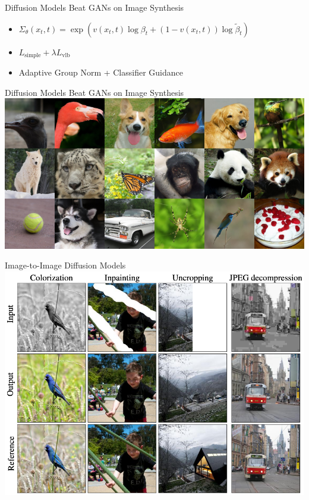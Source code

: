 \documentclass{beamer}
\begin{document}
\begin{frame}{Diffusion Models Beat GANs on Image Synthesis \cite{dhariwal2021diffusion}}
    \begin{itemize}
        \item $\Sigma_\theta(x_t, t) = \exp(v(x_t, t) \log \beta_t + (1 - v(x_t, t)) \log \tilde\beta_t)$
        \item $L_\text{simple} + \lambda L_\text{vlb}$
        \item Adaptive Group Norm + Classifier Guidance
    \end{itemize}
\end{frame}

\begin{frame}{Diffusion Models Beat GANs on Image Synthesis \cite{dhariwal2021diffusion}}
    \includegraphics[width=\textwidth]{../images/2022-03-17-diffusion_models_files/openai_sample.png}
\end{frame}

\begin{frame}{Image-to-Image Diffusion Models \cite{saharia2021palette}}
    \includegraphics[width=\textwidth]{../images/2022-03-17-diffusion_models_files/im2im.png}
\end{frame}
\end{document}
